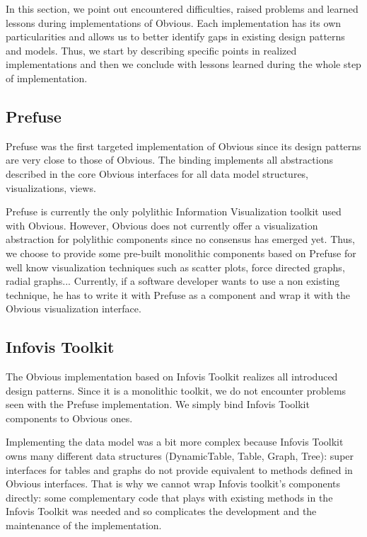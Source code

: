 In this section, we point out encountered difficulties, raised problems and learned lessons during implementations of Obvious. Each implementation has its own particularities and allows us to better identify gaps in existing design patterns and models. Thus, we start by describing specific points in realized implementations and then we conclude with lessons learned during the whole step of implementation.

\subsection{Prefuse}

Prefuse was the first targeted implementation of Obvious since its design patterns are very close to those of Obvious.  The binding implements all abstractions described in the core Obvious interfaces for all data model structures, visualizations, views.

Prefuse is currently the only polylithic Information Visualization toolkit used with Obvious. However, Obvious does not currently offer a visualization abstraction for polylithic components since no consensus has emerged yet. Thus, we choose to provide some pre-built monolithic components based on Prefuse for well know visualization techniques such as scatter plots, force directed graphs, radial graphs... Currently, if a software developer wants to use a non existing technique, he has to write it with Prefuse as a component and wrap it with the Obvious visualization interface.

\subsection{Infovis Toolkit}

The Obvious implementation based on Infovis Toolkit realizes all introduced design patterns. Since it is a monolithic toolkit, we do not encounter problems seen with the Prefuse implementation. We simply bind Infovis Toolkit components to Obvious ones.

Implementing the data model was a bit more complex because Infovis Toolkit owns many different data structures (DynamicTable, Table, Graph, Tree): super interfaces for tables and graphs do not provide equivalent to methods defined in Obvious interfaces. That is why we cannot wrap Infovis toolkit's components directly: some complementary code that plays with existing methods in the Infovis Toolkit was needed and so complicates the development and the maintenance of the implementation.

